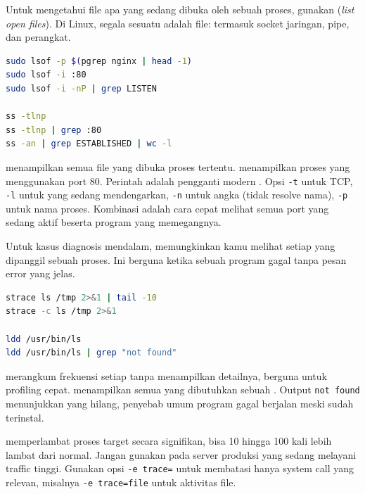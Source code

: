 Untuk mengetahui file apa yang sedang dibuka oleh sebuah proses, gunakan
 (\emph{list open files}). Di Linux, segala sesuatu adalah file:
termasuk socket jaringan, pipe, dan perangkat.

\begin{lstlisting}[language=bash, caption={Memantau file terbuka dan koneksi jaringan}]
sudo lsof -p $(pgrep nginx | head -1)
sudo lsof -i :80
sudo lsof -i -nP | grep LISTEN

ss -tlnp
ss -tlnp | grep :80
ss -an | grep ESTABLISHED | wc -l
\end{lstlisting}

 menampilkan semua file yang dibuka proses tertentu.  menampilkan proses yang menggunakan port 80. Perintah  adalah
pengganti modern . Opsi \texttt{-t} untuk TCP, \texttt{-l} untuk
yang sedang mendengarkan, \texttt{-n} untuk angka (tidak resolve nama), \texttt{-p}
untuk nama proses. Kombinasi  adalah cara cepat melihat semua
port yang sedang aktif beserta program yang memegangnya.

Untuk kasus diagnosis mendalam,  memungkinkan kamu melihat setiap
 yang dipanggil sebuah proses. Ini berguna ketika sebuah program
gagal tanpa pesan error yang jelas.

\begin{lstlisting}[language=bash, caption={Analisis mendalam dengan strace dan ldd}]
strace ls /tmp 2>&1 | tail -10
strace -c ls /tmp 2>&1

ldd /usr/bin/ls
ldd /usr/bin/ls | grep "not found"
\end{lstlisting}

 merangkum frekuensi setiap  tanpa menampilkan detailnya,
berguna untuk profiling cepat.  menampilkan semua  yang
dibutuhkan sebuah . Output \texttt{not found} menunjukkan  yang
hilang, penyebab umum program gagal berjalan meski sudah terinstal.

\begin{warningbox}
 memperlambat proses target secara signifikan, bisa 10 hingga 100
kali lebih lambat dari normal. Jangan gunakan pada server produksi yang sedang
melayani traffic tinggi. Gunakan opsi \texttt{-e trace=} untuk membatasi hanya
system call yang relevan, misalnya \texttt{-e trace=file} untuk aktivitas file.
\end{warningbox}

